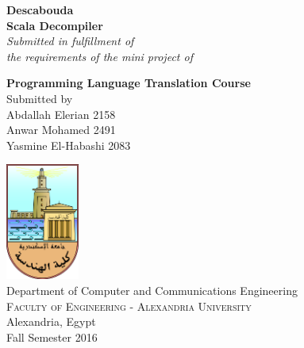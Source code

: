 \begin{titlepage}

\begin{center}

\Large \textbf {Descabouda}\\
\Large \textbf {Scala Decompiler}\\[0.5in]

       \small \emph{Submitted in fulfillment of\\
        the requirements of the mini project of}
        \vspace{.2in}

       {\bf Programming Language Translation Course}\\[0.5in]

\normalsize Submitted by \\
\normalsize Abdallah Elerian \hspace{10mm} 2158 \\
\normalsize Anwar Mohamed \hspace{10mm} 2491 \\
\normalsize Yasmine El-Habashi \hspace{4.5mm} 2083 \\


\vfill

\includegraphics[width=0.18\textwidth]{./foe-logo}\\[0.1in]
\Large{Department of Computer and Communications Engineering}\\
\normalsize
\textsc{Faculty of Engineering - Alexandria University}\\
Alexandria, Egypt\\
\vspace{0.2cm}
Fall Semester 2016

\end{center}

\end{titlepage}
